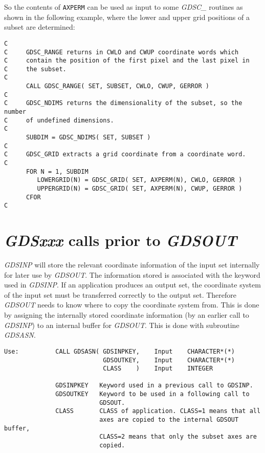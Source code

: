 So the contents of {\tt AXPERM} can be used as input to some {\sl
GDSC\_\/} routines as shown in the following example, where the lower
and upper grid positions of a subset are determined:

\begin{verbatim}
C
C     GDSC_RANGE returns in CWLO and CWUP coordinate words which
C     contain the position of the first pixel and the last pixel in
C     the subset.
C
      CALL GDSC_RANGE( SET, SUBSET, CWLO, CWUP, GERROR )
C
C     GDSC_NDIMS returns the dimensionality of the subset, so the number
C     of undefined dimensions.
C
      SUBDIM = GDSC_NDIMS( SET, SUBSET )
C
C     GDSC_GRID extracts a grid coordinate from a coordinate word.
C
      FOR N = 1, SUBDIM
         LOWERGRID(N) = GDSC_GRID( SET, AXPERM(N), CWLO, GERROR )
         UPPERGRID(N) = GDSC_GRID( SET, AXPERM(N), CWUP, GERROR )
      CFOR
C
\end{verbatim}

\section{{\sl GDSxxx\/} calls prior to {\sl GDSOUT\/}}

{\sl GDSINP\/} will store the relevant coordinate information of the
input set internally for later use by {\sl GDSOUT\/}.  The information
stored is associated with the keyword used in {\sl GDSINP\/}. If an
application produces an output set, the coordinate system of the input
set must be transferred correctly to the output set. Therefore {\sl
GDSOUT\/} needs to know where to copy the coordinate system from. This
is done by assigning the internally stored coordinate information (by an
earlier call to {\sl GDSINP\/}) to an internal buffer for {\sl
GDSOUT\/}. This is done with subroutine {\sl GDSASN\/}.

\begin{verbatim}
Use:          CALL GDSASN( GDSINPKEY,    Input    CHARACTER*(*)
                           GDSOUTKEY,    Input    CHARACTER*(*)
                           CLASS    )    Input    INTEGER

              GDSINPKEY   Keyword used in a previous call to GDSINP.
              GDSOUTKEY   Keyword to be used in a following call to
                          GDSOUT.
              CLASS       CLASS of application. CLASS=1 means that all
                          axes are copied to the internal GDSOUT buffer,
                          CLASS=2 means that only the subset axes are
                          copied.
\end{verbatim}

